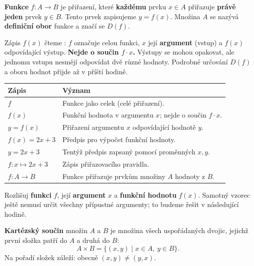\documentclass[11pt,a4paper]{article}
\begin{document}
\begin{definiceBox}[title={Definice - Funkce}]
\textbf{Funkce} $f\colon A\to B$ je přiřazení, které \textbf{každému}
prvku $x\in A$ přiřazuje \textbf{právě jeden} prvek $y\in B$.
Tento prvek zapisujeme $y=f(x)$. Množina $A$ se nazývá
\textbf{definiční obor} funkce a značí se $D(f)$.
\end{definiceBox}

Zápis $f(x)$ čteme : $f$ označuje celou
funkci, $x$ její \textbf{argument} (vstup) a $f(x)$ odpovídající výstup.
\textbf{Nejde o součin $f\cdot x$.} Výstupy se mohou opakovat, ale jednomu
vstupu nesmějí odpovídat dvě různé hodnoty. Podrobné určování $D(f)$ a
oboru hodnot přijde až v příští hodině.

\begin{center}
\small
\renewcommand{\arraystretch}{1.12}
\begin{tabularx}{\linewidth}{@{}p{28mm}X@{}}
\toprule
\textbf{Zápis} & \textbf{Význam}\\
\midrule
$f$ & Funkce jako celek (celé přiřazení).\\
$f(x)$ & Funkční hodnota v argumentu $x$; nejde o součin $f\cdot x$.\\
$y=f(x)$ & Přiřazení argumentu $x$ odpovídající hodnotě $y$.\\
$f(x)=2x+3$ & Předpis pro výpočet funkční hodnoty.\\
$y=2x+3$ & Tentýž předpis zapsaný pomocí proměnných $x,y$.\\
$f\colon x\mapsto 2x+3$ & Zápis přiřazovacího pravidla.\\
$f\colon A\to B$ & Funkce přiřazuje prvkům množiny $A$ hodnoty z $B$.\\
\bottomrule
\end{tabularx}
\end{center}
Rozlišuj \textbf{funkci} $f$, její \textbf{argument} $x$ a
\textbf{funkční hodnotu} $f(x)$. Samotný vzorec ještě nemusí určit
všechny přípustné argumenty; to budeme řešit v následující hodině.



\begin{definiceBox}[title={Definice - Kartézský součin}]
\textbf{Kartézský součin} množin $A$ a $B$ je množina všech uspořádaných
dvojic, jejichž první složka patří do $A$ a druhá do $B$:
\[
A\times B=\{(x,y)\mid x\in A,\ y\in B\}.
\]
Na pořadí složek záleží: obecně $(x,y)\neq(y,x)$.
\end{definiceBox}
\end{document}
